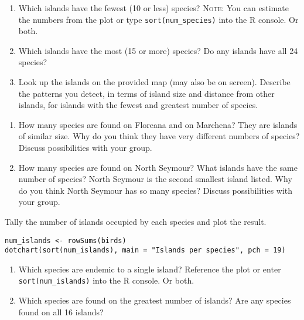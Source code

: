 \documentclass[11pt]{article}
\newcommand{\bigSpace}{\vspace{5\baselineskip}}
\begin{document}
\begin{enumerate}[resume]
\item Which islands have the fewest (10 or less) species? \textsc{Note:} You can estimate the numbers from the plot or type \texttt{sort(num\_species)} into the R console. Or both.

\bigSpace

\item Which islands have the most (15 or more) species? Do any islands have all 24 species?

\bigSpace

\item Look up the islands on the provided map (may also be on screen). Describe the patterns you detect, in terms of island size and distance from other islands, for islands with the fewest and greatest number of species.

\end{enumerate}


\newpage %


\begin{enumerate}[resume]
\item How many species are found on Floreana and on Marchena? They are islands of similar size. Why do you think they have very different numbers of species? Discuss possibilities with your group.

\bigSpace

\item How many species are found on North Seymour? What islands have the same number of species? North Seymour is the second smallest island listed. Why do you think North Seymour has so many species? Discuss possibilities with your group.

\bigSpace

\end{enumerate}

Tally the number of islands occupied by each species and plot the result.

\begin{verbatim}
num_islands <- rowSums(birds)
dotchart(sort(num_islands), main = "Islands per species", pch = 19)
\end{verbatim}

\medskip


\begin{enumerate}[resume]
\item Which species are endemic to a single island? Reference the plot or enter \texttt{sort(num\_islands)} into the R console. Or both.

\bigSpace

\item Which species are found on the greatest number of islands? Are any species found on all 16 islands?

\bigSpace

\end{enumerate}
\end{document}

